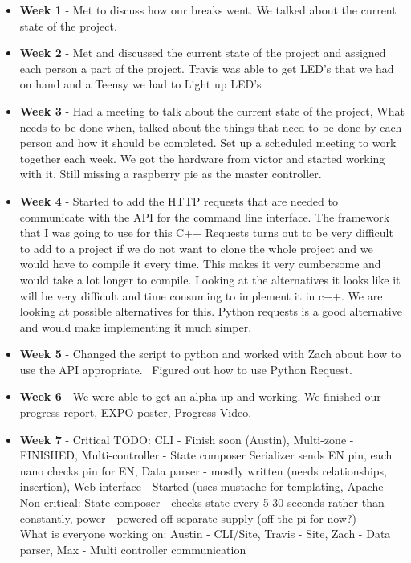 \documentclass[onecolumn, draftclsnofoot,10pt, compsoc]{IEEEtran}
\begin{document}
				\begin{itemize}
					\item \textbf{Week 1} - Met to discuss how our breaks went. We talked about the current state of the project.
					\item \textbf{Week 2} - Met and discussed the current state of the project and assigned each person a part of the project.  Travis was able to get LED's that we had on hand and a Teensy we had to Light up LED's
					\item \textbf{Week 3} - Had a meeting to talk about the current state of the project, What needs to be done when, talked about the things that need to be done by each person and how it should be completed. Set up a scheduled meeting to work together each week. We got the hardware from victor and started working with it. Still missing a raspberry pie as the master controller.
					\item \textbf{Week 4} - Started to add the HTTP requests that are needed to communicate with the API for the command line interface. The framework that I was going to use for this C++ Requests turns out to be very difficult to add to a project if we do not want to clone the whole project and we would have to compile it every time. This makes it very cumbersome and would take a lot longer to compile. Looking at the alternatives it looks like it will be very difficult and time consuming to implement it in c++. We are looking at possible alternatives for this. Python requests is a good alternative and would make implementing it much simper.
					\item \textbf{Week 5} - Changed the script to python and worked with Zach about how to use the API appropriate.  Figured out how to use Python Request.
					\item \textbf{Week 6} - We were able to get an alpha up and working. We finished our progress report, EXPO poster, Progress Video.
					\item \textbf{Week 7} - Critical TODO: CLI - Finish soon (Austin), Multi-zone - FINISHED, Multi-controller - State composer Serializer sends EN pin, each nano checks pin for EN, Data parser - mostly written (needs relationships, insertion), Web interface - Started (uses mustache for templating, Apache
											\\ Non-critical: State composer - checks state every 5-30 seconds rather than constantly, power - powered off separate supply (off the pi for now?)
											\\ What is everyone working on: Austin - CLI/Site, Travis - Site, Zach - Data parser, Max - Multi controller communication

\end{itemize}
\end{document}
